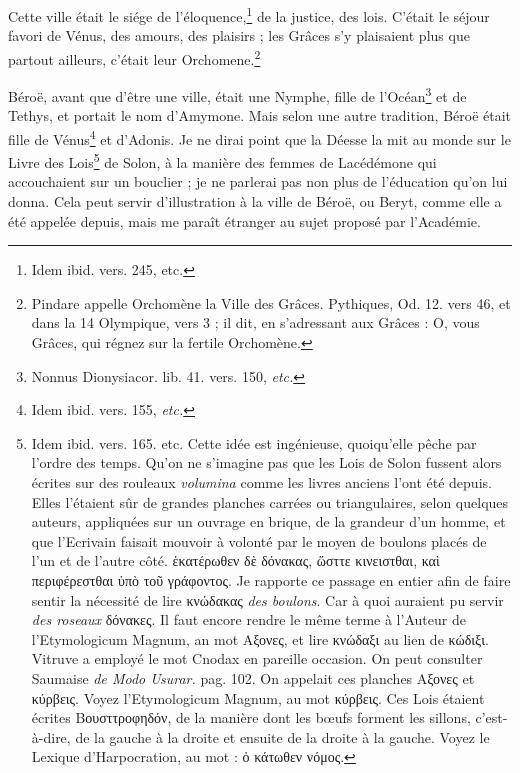 \documentclass[a4paper, 18pt, oneside]{article}
\begin{document}
Cette ville était le siége de l'éloquence,\footnote{Idem ibid. vers. 245, etc.} de la justice, des lois. C'était le séjour favori de Vénus, des amours, des plaisirs ; les Grâces s'y plaisaient plus que partout ailleurs, c'était leur Orchomene.\footnote{Pindare appelle Orchomène la Ville des Grâces. Pythiques, Od. 12. vers 46, et dans la 14 Olympique, vers 3 ; il dit, en s'adressant aux Grâces : O, vous Grâces, qui régnez sur la fertile Orchomène.}

Béroë, avant que d'être une ville, était une Nymphe, fille de l'Océan\footnote{Nonnus Dionysiacor. lib. 41. vers. 150, \emph{etc.}} et de Tethys, et portait le nom d'Amymone. Mais selon une autre tradition, Béroë était fille de Vénus\footnote{Idem ibid. vers. 155, \emph{etc.}} et d'Adonis. Je ne dirai point que la Déesse la mit au monde sur le Livre des Lois\footnote{Idem ibid. vers. 165. etc. Cette idée est ingénieuse, quoiqu'elle pêche par l'ordre des temps. Qu'on ne s'imagine pas que les Lois de Solon fussent alors écrites sur des rouleaux \emph{volumina} comme les livres anciens l'ont été depuis. Elles l'étaient sûr de grandes planches carrées ou triangulaires, selon quelques auteurs, appliquées sur un ouvrage en brique, de la grandeur d'un homme, et que l'Ecrivain faisait mouvoir à volonté par le moyen de boulons placés de l'un et de l'autre côté. ἑκατέρωθεν δὲ δόνακας, ὥσττε κινειστθαι, καὶ περιφέρεστθαι ὑπὸ τοῦ γράφοντος. Je rapporte ce passage en entier afin de faire sentir la nécessité de lire κνώδακας \emph{des boulons}. Car à quoi auraient pu servir \emph{des roseaux} δόνακες. Il faut encore rendre le même terme à l'Auteur de l'Etymologicum Magnum, an mot Αξονες, et lire κνώδαξι au lien de κώδιξι. Vitruve a employé le mot Cnodax en pareille occasion. On peut consulter Saumaise \emph{de Modo Usurar.} pag. 102. On appelait ces planches Αξονες et κύρβεις. Voyez l'Etymologicum Magnum, au mot κύρβεις. Ces Lois étaient écrites Βουσττροφηδόν, de la manière dont les bœufs forment les sillons, c'est-à-dire, de la gauche à la droite et ensuite de la droite à la gauche. Voyez le Lexique d'Harpocration, au mot : ὀ κάτωθεν νόμος.} de Solon, à la manière des femmes de Lacédémone qui accouchaient sur un bouclier ; je ne parlerai pas non plus de l'éducation qu'on lui donna. Cela peut servir d'illustration à la ville de Béroë, ou Beryt, comme elle a été appelée depuis, mais me paraît étranger au sujet proposé par l'Académie.
\end{document}
